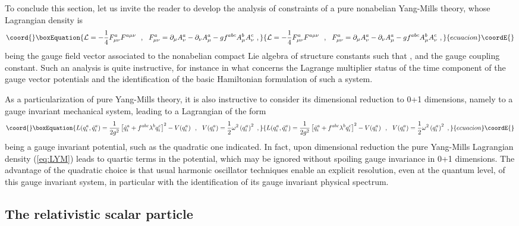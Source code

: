\documentclass[a4paper,11pt]{article}
\begin{document}
To conclude this section, let us invite the reader to develop the
analysis of constraints of a pure nonabelian Yang-Mills theory, whose
Lagrangian density is
\begin{equation}\coord{}\boxEquation{
{\cal L}=-\frac{1}{4}F^a_{\mu\nu}F^{a\mu\nu}\ \ ,\ \ 
F^a_{\mu\nu}=\partial_\mu A^a_\nu-\partial_\nu A^a_\mu-
gf^{abc}A^b_\mu A^c_\nu\ ,
\label{eq:LYM}
}{
{\cal L}=-\frac{1}{4}F^a_{\mu\nu}F^{a\mu\nu}\ \ ,\ \ 
F^a_{\mu\nu}=\partial_\mu A^a_\nu-\partial_\nu A^a_\mu-
gf^{abc}A^b_\mu A^c_\nu\ ,
}{ecuacion}\coordE{}\end{equation}
\coordHE{} being the gauge field vector associated to the nonabelian
compact Lie algebra of structure constants \coordHE{} such that
\myHighlight{$[T^a,T^b]=if^{abc}T^c$}\coordHE{}, and \myHighlight{$g$}\coordHE{} the gauge coupling constant. Such an
analysis is quite instructive, for instance in what concerns the
Lagrange multiplier status of the time component \myHighlight{$A^a_0$}\coordHE{} of the gauge vector
potentials and the identification of the basic Hamiltonian formulation of
such a system.

As a particularization of pure Yang-Mills theory, it is also instructive
to consider its dimensional reduction to 0+1 dimensions,\cite{JG3} namely to
a gauge invariant mechanical system, leading to a Lagrangian of the
form
\begin{equation}\coord{}\boxEquation{
L(q^a_i,\dot{q}^a_i)=\frac{1}{2g^2}\left[\dot{q}^a_i+
f^{abc}\lambda^bq^c_i\right]^2-V(q^a_i)\ \ ,\ \ 
V(q^a_i)=\frac{1}{2}\omega^2\left(q^a_i\right)^2\ ,
}{
L(q^a_i,\dot{q}^a_i)=\frac{1}{2g^2}\left[\dot{q}^a_i+
f^{abc}\lambda^bq^c_i\right]^2-V(q^a_i)\ \ ,\ \ 
V(q^a_i)=\frac{1}{2}\omega^2\left(q^a_i\right)^2\ ,
}{ecuacion}\coordE{}\end{equation}
\myHighlight{$V(q^a_i)$}\coordHE{} being a gauge invariant potential, such as the quadratic one
indicated. In fact, upon dimensional reduction the pure Yang-Mills
Lagrangian density (\ref{eq:LYM}) leads to quartic terms
in the potential, which may be ignored without spoiling gauge invariance
in 0+1 dimensions. The advantage of the quadratic choice is that usual
harmonic oscillator techniques enable an explicit resolution, even at the
quantum level, of this gauge invariant system, in particular with the
identification of its gauge invariant physical spectrum.

\subsection{The relativistic scalar particle}
\label{Subsect5.2}
\end{document}
